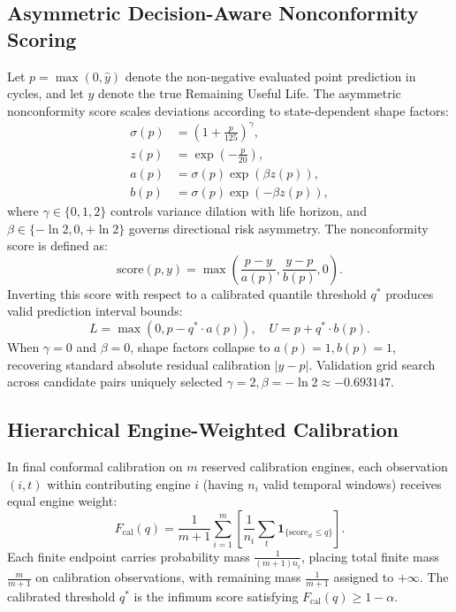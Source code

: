 \documentclass[conference]{IEEEtran}
\newcommand{\LowerBound}{L}
\newcommand{\UpperBound}{U}
\newcommand{\sigmap}{\sigma(p)}
\newcommand{\zp}{z(p)}
\newcommand{\ap}{a(p)}
\newcommand{\bp}{b(p)}
\begin{document}
\subsection{Asymmetric Decision-Aware Nonconformity Scoring}
Let $p = \max(0, \hat{y})$ denote the non-negative evaluated point prediction in cycles, and let $y$ denote the true Remaining Useful Life. The asymmetric nonconformity score scales deviations according to state-dependent shape factors:
\begin{align}
\sigmap &= \left(1 + \frac{p}{125}\right)^\gamma, \\
\zp &= \exp\left(-\frac{p}{20}\right), \\
\ap &= \sigmap \exp(\beta \zp), \\
\bp &= \sigmap \exp(-\beta \zp),
\end{align}
where $\gamma \in \{0, 1, 2\}$ controls variance dilation with life horizon, and $\beta \in \{-\ln 2, 0, +\ln 2\}$ governs directional risk asymmetry. The nonconformity score is defined as:
\begin{equation}
\text{score}(p, y) = \max\left(\frac{p - y}{\ap}, \frac{y - p}{\bp}, 0\right).
\end{equation}
Inverting this score with respect to a calibrated quantile threshold $q^*$ produces valid prediction interval bounds:
\begin{equation}
\LowerBound = \max(0, p - q^* \cdot \ap), \quad \UpperBound = p + q^* \cdot \bp.
\end{equation}
When $\gamma = 0$ and $\beta = 0$, shape factors collapse to $a(p)=1, b(p)=1$, recovering standard absolute residual calibration $|y - p|$. Validation grid search across candidate pairs uniquely selected $\gamma = 2, \beta = -\ln 2 \approx -0.693147$.

\subsection{Hierarchical Engine-Weighted Calibration}
In final conformal calibration on $m$ reserved calibration engines, each observation $(i, t)$ within contributing engine $i$ (having $n_i$ valid temporal windows) receives equal engine weight:
\begin{equation}
F_{\text{cal}}(q) = \frac{1}{m+1} \sum_{i=1}^m \left[ \frac{1}{n_i} \sum_{t} \mathbf{1}_{\{\text{score}_{it} \le q\}} \right].
\end{equation}
Each finite endpoint carries probability mass $\frac{1}{(m+1)n_i}$, placing total finite mass $\frac{m}{m+1}$ on calibration observations, with remaining mass $\frac{1}{m+1}$ assigned to $+\infty$. The calibrated threshold $q^*$ is the infimum score satisfying $F_{\text{cal}}(q) \ge 1 - \alpha$.
\end{document}
